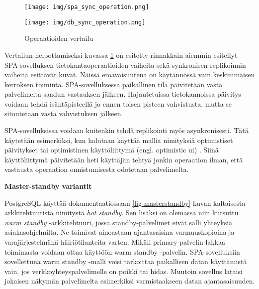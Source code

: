 \documentclass[finnish,twoside,censored,csm,sw-track-2018]{HYthesisML}
\begin{document}
\begin{figure}[ht]
\centering
\begin{minipage}{.5\textwidth}
  \centering
  \texttt{[image: img/spa\_sync\_operation.png]}
\end{minipage}%
\begin{minipage}{.5\textwidth}
  \centering
  \texttt{[image: img/db\_sync\_operation.png]}
\end{minipage}
\caption{Operaatioiden vertailu}
\label{fig-operaatioiden-vertailu}
\end{figure}

Vertailun helpottamiseksi kuvassa \ref{fig-operaatioiden-vertailu} on esitetty rinnakkain aiemmin esitellyt SPA-sovelluksen tietokantaoperaatioiden vaiheita sekä synkronisen replikoinnin vaiheita esittävät kuvat. Näissä eroavaisuutena on käytännössä vain keskimmäisen kerroksen toiminta. SPA-sovelluksessa paikallinen tila päivitetään vasta palvelimelta saadun vastauksen jälkeen. Hajautetuissa tietokannoissa päivitys voidaan tehdä isäntäpisteellä jo ennen toisen pisteen vahvistusta, mutta se sitoutetaan vasta vahvistuksen jälkeen.

SPA-sovelluksissa voidaan kuitenkin tehdä replikointi myös asynkronisesti. Tätä käytetään esimerkiksi, kun halutaan käyttää mallia nimityksiä optimistiset päivitykset tai optimistinen käyttöliittymä (engl. optimistic ui) \citep{optimistic-ui}. Siinä käyttöliittymä päivitetään heti käyttäjän tehtyä jonkin operaation ilman, että vastausta operaation onnistumisesta odotetaan palvelimelta.

\textbf{Master-standby variantit}

PostgreSQL käyttää dokumentaatiossaan \ref{fig-masterstandby} kuvan kaltaisesta arkkitehtuurista nimitystä \textit{hot standby}. Sen lisäksi on olemassa niin kutsuttu \textit{warm standby} -arkkitehtuuri, jossa standby-palvelimet eivät salli yhteyksiä asiakasohjelmilta. Ne toimivat ainoastaan ajantasaisina varmuuskopioina ja varajärjestelmänä häiriötilanteita varten. Mikäli primary-palvelin lakkaa toimimasta voidaan ottaa käyttöön warm standby -palvelin. SPA-sovelluksiin sovellettuna warm standby -malli voisi tarkoittaa paikallisen datan käyttämistä vain, jos verkkoyhteyspalvelimelle on poikki tai hidas. Muutoin sovellus lataisi jokaisen näkymän palvelimelta esimerkiksi varmistaakseen datan ajantasaisuuden.
\end{document}
